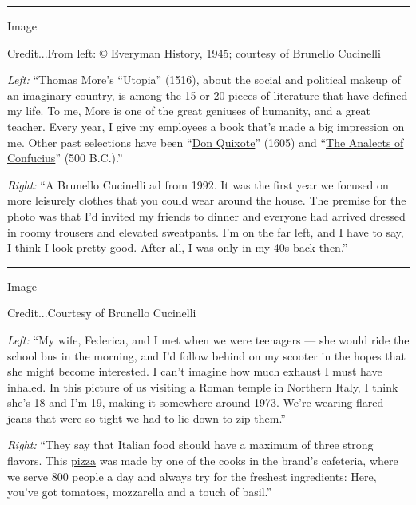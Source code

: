 \begin{center}\rule{0.5\linewidth}{\linethickness}\end{center}

Image

Credit...From left: © Everyman History, 1945; courtesy of Brunello
Cucinelli

\emph{Left:} ``Thomas More's
``\href{https://www.bl.uk/learning/timeline/item126618.html}{Utopia}''
(1516), about the social and political makeup of an imaginary country,
is among the 15 or 20 pieces of literature that have defined my life. To
me, More is one of the great geniuses of humanity, and a great teacher.
Every year, I give my employees a book that's made a big impression on
me. Other past selections have been
``\href{https://www.penguinrandomhouse.com/books/286572/don-quixote-by-miguel-de-cervantes-saavedra/9780142437230/}{Don
Quixote}'' (1605) and
``\href{https://www.penguinrandomhouse.com/books/306130/the-analects-by-confucius/9780143106852/}{The
Analects of Confucius}'' (500 B.C.).''

\emph{Right:} ``A Brunello Cucinelli ad from 1992. It was the first year
we focused on more leisurely clothes that you could wear around the
house. The premise for the photo was that I'd invited my friends to
dinner and everyone had arrived dressed in roomy trousers and elevated
sweatpants. I'm on the far left, and I have to say, I think I look
pretty good. After all, I was only in my 40s back then.''

\begin{center}\rule{0.5\linewidth}{\linethickness}\end{center}

Image

Credit...Courtesy of Brunello Cucinelli

\emph{Left:} ``My wife, Federica, and I met when we were teenagers ---
she would ride the school bus in the morning, and I'd follow behind on
my scooter in the hopes that she might become interested. I can't
imagine how much exhaust I must have inhaled. In this picture of us
visiting a Roman temple in Northern Italy, I think she's 18 and I'm 19,
making it somewhere around 1973. We're wearing flared jeans that were so
tight we had to lie down to zip them.''

\emph{Right:} ``They say that Italian food should have a maximum of
three strong flavors. This
\href{https://cooking.nytimes.com/68861692-nyt-cooking/807163-our-greatest-pizza-recipes}{pizza}
was made by one of the cooks in the brand's cafeteria, where we serve
800 people a day and always try for the freshest ingredients: Here,
you've got tomatoes, mozzarella and a touch of basil.''


